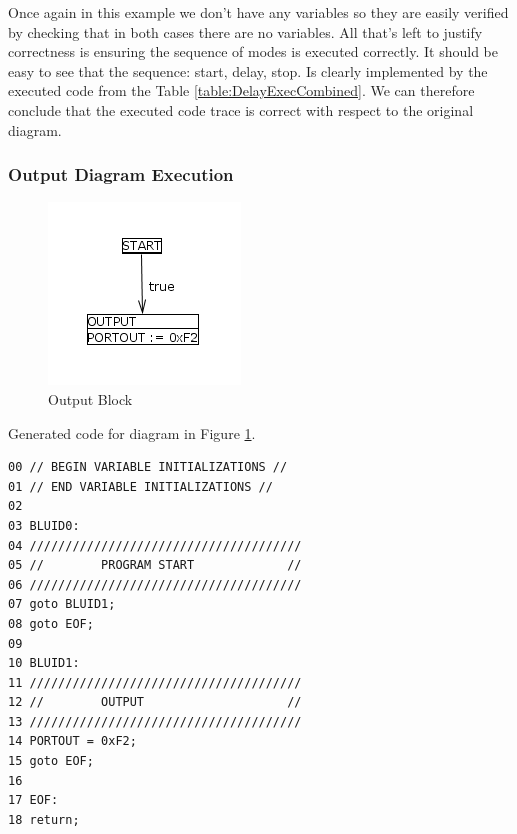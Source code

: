 Once again in this example we don't have any variables so they 
are easily verified by checking that in both cases there are no variables. 
All that's left to justify correctness is ensuring the sequence of modes 
is executed correctly. It should be easy to see that the sequence: 
start, delay, stop. Is clearly implemented by the executed code from the 
Table \ref{table:DelayExecCombined}. We can therefore conclude that the 
executed code trace is correct with respect to the original diagram.

\subsubsection{Output Diagram Execution}

\begin{figure}[htb]
	\centering
	\includegraphics[width=\imgmedsmall]{./images/correctness_ex_output.png}
	\caption{Output Block}
	\label{fig:correctness_ex_output}
\end{figure}

Generated  code for diagram in Figure \ref{fig:correctness_ex_output}.
\begin{lstlisting}[frame=single]
00 // BEGIN VARIABLE INITIALIZATIONS //
01 // END VARIABLE INITIALIZATIONS //
02 
03 BLUID0:
04 //////////////////////////////////////
05 //        PROGRAM START             //
06 //////////////////////////////////////
07 goto BLUID1;
08 goto EOF;
09 
10 BLUID1:
11 //////////////////////////////////////
12 //        OUTPUT                    //
13 //////////////////////////////////////
14 PORTOUT = 0xF2;
15 goto EOF;
16 
17 EOF:
18 return;
\end{lstlisting}


